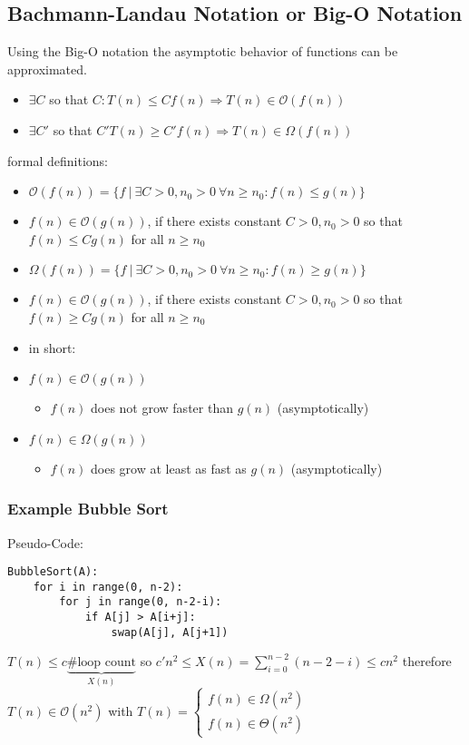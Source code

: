 \documentclass[a4paper]{article}
\begin{document}
\subsection{Bachmann-Landau Notation or Big-O Notation}
Using the Big-O notation the asymptotic behavior of functions can be approximated.
\begin{itemize}
    \item $ \exists C $ so that $ C:T(n) \leq Cf(n) \Rightarrow T(n) \in \mathcal{O}(f(n)) $ 
    \item $ \exists C' $ so that $ C' T(n) \geq C'f(n) \Rightarrow T(n) \in \Omega(f(n)) $ 
\end{itemize}
formal definitions:
\begin{itemize}
    \item $ \mathcal{O}(f(n)) = \{f \  | \ \exists C > 0, n_0 > 0 \  \forall n \geq n_0 : f(n) \leq g(n)\} $ 
    \item $ f(n) \in \mathcal{O}(g(n)) $, if there exists constant $ C > 0, n_0 >0 $ so that $ f(n) \leq C g(n) $ for all $ n \geq n_0 $ 
    \item $   \Omega(f(n)) = \{f \  | \ \exists C > 0, n_0 > 0 \  \forall n \geq n_0 : f(n) \geq g(n)\} $ 
    \item $ f(n) \in \mathcal{O}(g(n)) $, if there exists constant $ C > 0, n_0 >0 $ so that $ f(n) \geq C g(n) $ for all $ n \geq n_0 $ 
    \item in short:
    \item $ f(n) \in \mathcal{O}(g(n)) $ 
        \begin{itemize}
            \item $ f(n) $ does not grow faster than $ g(n) $ (asymptotically) 
        \end{itemize}
    \item $ f(n) \in \Omega(g(n)) $ 
        \begin{itemize}
            \item $ f(n) $ does grow at least as fast as $ g(n) $ (asymptotically) 
        \end{itemize}
\end{itemize}

\subsubsection{Example Bubble Sort}
Pseudo-Code:
\begin{lstlisting}
BubbleSort(A):
    for i in range(0, n-2):
        for j in range(0, n-2-i):
            if A[j] > A[i+j]:
                swap(A[j], A[j+1])
\end{lstlisting}
$ T(n) \leq c \underbrace{\# \text{loop count}}_{X(n)} $ 
so $ c' n^2 \leq X(n) = \sum_{i=0}^{n-2} (n-2-i) \leq c n^2 $ therefore $ T(n) \in \mathcal{O}(n^2) $ with 
$ T(n)= \begin{cases}
    f(n) \in \Omega(n^2) \\
    f(n) \in \Theta(n^2)
\end{cases} $ 
\end{document}
